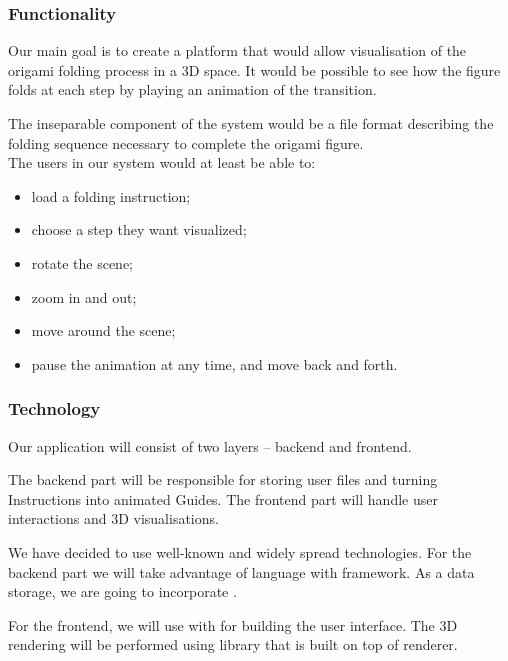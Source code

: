 \subsubsection{Functionality}

Our main goal is to create a platform that would allow visualisation of the origami folding process in a 3D space.
It would be possible to see how the figure folds at each step by playing an animation of the transition.

The inseparable component of the system would be a file format describing the folding sequence necessary to complete the origami figure.\\

The users in our system would at least be able to:
\begin{itemize}
	\item load a folding instruction;
	\item choose a step they want visualized;
	\item rotate the scene;
    \item zoom in and out;
	\item move around the scene;
	\item pause the animation at any time, and move back and forth.
\end{itemize}

\subsubsection{Technology}

Our application will consist of two layers -- backend and frontend.

The backend part will be responsible for storing user files and turning Instructions into animated Guides.
The frontend part will handle user interactions and 3D visualisations.

We have decided to use well-known and widely spread technologies.
For the backend part we will take advantage of  language with  framework.
As a data storage, we are going to incorporate .

For the frontend, we will use  with  for building the user interface.
The 3D rendering will be performed using  library that is built on top of  renderer.

